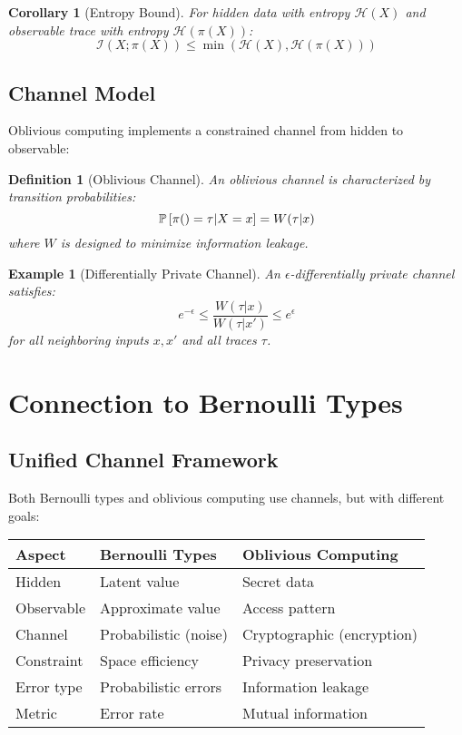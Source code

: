 \documentclass[11pt,final]{article}
\newtheorem{corollary}[theorem]{Corollary}
\newtheorem{definition}[theorem]{Definition}
\newtheorem{example}[theorem]{Example}
\renewcommand{\Pattern}[1]{\pi(#1)}
\newcommand{\Entropy}[1]{\mathcal{H}(#1)}
\newcommand{\MutualInfo}[2]{\mathcal{I}(#1; #2)}
\begin{document}
\begin{corollary}[Entropy Bound]
For hidden data with entropy $\Entropy{X}$ and observable trace with entropy $\Entropy{\Pattern{X}}$:
\begin{equation}
\MutualInfo{X}{\Pattern{X}} \leq \min(\Entropy{X}, \Entropy{\Pattern{X}})
\end{equation}
\end{corollary}

\subsection{Channel Model}

Oblivious computing implements a constrained channel from hidden to observable:

\begin{definition}[Oblivious Channel]
An oblivious channel is characterized by transition probabilities:
\begin{equation}
\Prob{\Pattern{} = \tau | X = x} = W(\tau|x)
\end{equation}
where $W$ is designed to minimize information leakage.
\end{definition}

\begin{example}[Differentially Private Channel]
An $\epsilon$-differentially private channel satisfies:
\begin{equation}
e^{-\epsilon} \leq \frac{W(\tau|x)}{W(\tau|x')} \leq e^{\epsilon}
\end{equation}
for all neighboring inputs $x, x'$ and all traces $\tau$.
\end{example}

\section{Connection to Bernoulli Types}

\subsection{Unified Channel Framework}

Both Bernoulli types and oblivious computing use channels, but with different goals:

\begin{center}
\begin{tabular}{lll}
\textbf{Aspect} & \textbf{Bernoulli Types} & \textbf{Oblivious Computing} \\
\hline
Hidden & Latent value & Secret data \\
Observable & Approximate value & Access pattern \\
Channel & Probabilistic (noise) & Cryptographic (encryption) \\
Constraint & Space efficiency & Privacy preservation \\
Error type & Probabilistic errors & Information leakage \\
Metric & Error rate & Mutual information \\
\end{tabular}
\end{center}
\end{document}
